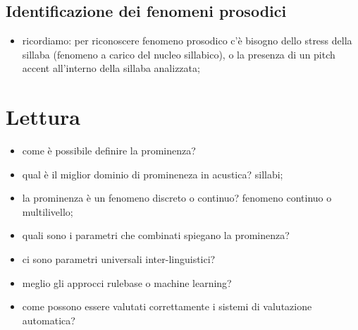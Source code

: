 \documentclass[twoside,twocolumn,11pt]{extarticle}
\theoremstyle{definition}
\begin{document}
	\subsection{Identificazione dei fenomeni prosodici}
		\begin{itemize}
			\item ricordiamo: per riconoscere fenomeno prosodico c'è bisogno dello stress della sillaba (fenomeno a carico del nucleo sillabico), o la presenza di un pitch accent all'interno della sillaba analizzata;
			
		\end{itemize}
	
\section{Lettura \cite{bib:prominence-by-acoustic-analyses}}
	\begin{itemize}
		\item come è possibile definire la prominenza?
		\item qual è il miglior dominio di promineneza in acustica? sillabi;
		\item la prominenza è un fenomeno discreto o continuo? fenomeno continuo o multilivello;
		\item quali sono i parametri che combinati spiegano la prominenza? 
		\item ci sono parametri universali inter-linguistici?
		\item meglio gli approcci rulebase o machine learning?
		\item come possono essere valutati correttamente i sistemi di valutazione automatica?
	\end{itemize}
\end{document}
